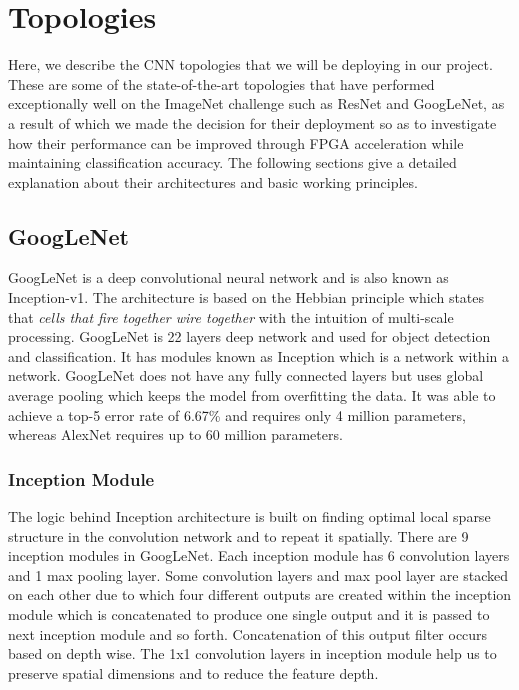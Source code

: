 \documentclass[titlepage]{report}
\begin{document}


\section{Topologies}
Here, we describe the CNN topologies that we will be deploying in our project. These are some of the state-of-the-art topologies that have performed exceptionally well on the ImageNet challenge such as ResNet and GoogLeNet, as a result of which we made the decision for their deployment so as to investigate how their performance can be improved through FPGA acceleration while maintaining classification accuracy. The following sections give a detailed explanation about their architectures and basic working principles.
\subsection{GoogLeNet}
GoogLeNet is a deep convolutional neural network and is also known as Inception-v1. The architecture is based on the Hebbian principle which states that \textit{cells that fire together wire together} with the intuition of multi-scale processing. GoogLeNet is 22 layers deep network and used for object detection and classification. It has modules known as Inception which is a network within a network. GoogLeNet does not have any fully connected layers but uses global average pooling which keeps the model from overfitting the data. It was able to achieve a top-5 error rate of 6.67\% and requires only 4 million parameters, whereas AlexNet requires up to 60 million parameters.

\subsubsection{Inception Module}
The logic behind Inception architecture is built on finding optimal local sparse structure in the convolution network and to repeat it spatially. There are 9 inception modules in GoogLeNet. Each inception module has 6 convolution layers and 1 max pooling layer. Some convolution layers and max pool layer are stacked on each other due to which four different outputs are created within the inception module which is concatenated to produce one single output and it is passed to next inception module and so forth. Concatenation of this output filter occurs based on depth wise. The 1x1 convolution layers in inception module help us to preserve spatial dimensions and to reduce the feature depth.
\end{document}
